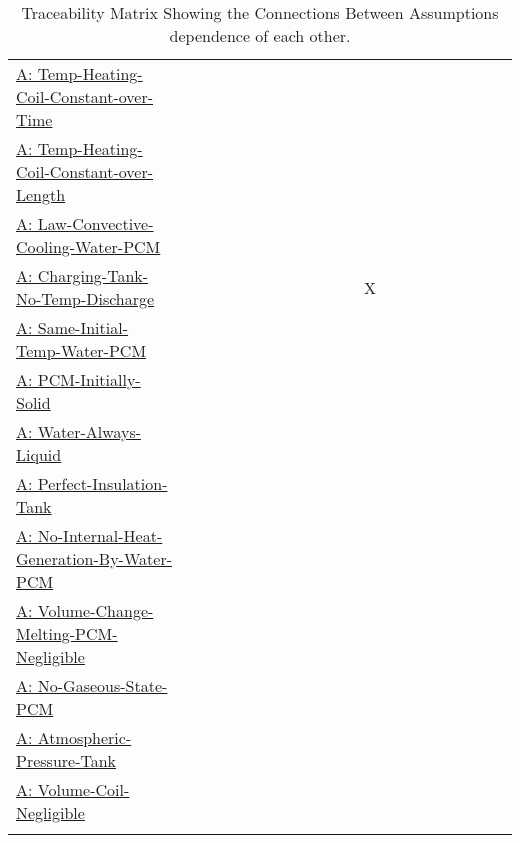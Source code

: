 \documentclass[12pt]{article}
\begin{document}
\begin{longtable}{l l l l l l l l l l l l l l l l l l l l l}
\\
\hyperref[assumpTHCCoT]{A: Temp-Heating-Coil-Constant-over-Time} &  &  &  &  &  &  &  &  &  &  &  &  &  &  &  &  &  &  &  & 
\\
\hyperref[assumpTHCCoL]{A: Temp-Heating-Coil-Constant-over-Length} &  &  &  &  &  &  &  &  &  &  &  &  &  &  &  &  &  &  &  & 
\\
\hyperref[assumpLCCWP]{A: Law-Convective-Cooling-Water-PCM} &  &  &  &  &  &  &  &  &  &  &  &  &  &  &  &  &  &  &  & 
\\
\hyperref[assumpCTNOD]{A: Charging-Tank-No-Temp-Discharge} &  &  &  &  &  &  &  &  &  &  &  & X &  &  &  &  &  &  &  & 
\\
\hyperref[assumpSITWP]{A: Same-Initial-Temp-Water-PCM} &  &  &  &  &  &  &  &  &  &  &  &  &  &  &  &  &  &  &  & 
\\
\hyperref[assumpPIS]{A: PCM-Initially-Solid} &  &  &  &  &  &  &  &  &  &  &  &  &  &  &  &  &  &  &  & 
\\
\hyperref[assumpWAL]{A: Water-Always-Liquid} &  &  &  &  &  &  &  &  &  &  &  &  &  &  &  &  &  &  &  & 
\\
\hyperref[assumpPIT]{A: Perfect-Insulation-Tank} &  &  &  &  &  &  &  &  &  &  &  &  &  &  &  &  &  &  &  & 
\\
\hyperref[assumpNIHGBWP]{A: No-Internal-Heat-Generation-By-Water-PCM} &  &  &  &  &  &  &  &  &  &  &  &  &  &  &  &  &  &  &  & 
\\
\hyperref[assumpVCMPN]{A: Volume-Change-Melting-PCM-Negligible} &  &  &  &  &  &  &  &  &  &  &  &  &  &  &  &  &  &  &  & 
\\
\hyperref[assumpNGSP]{A: No-Gaseous-State-PCM} &  &  &  &  &  &  &  &  &  &  &  &  &  &  &  &  &  &  &  & 
\\
\hyperref[assumpAPT]{A: Atmospheric-Pressure-Tank} &  &  &  &  &  &  &  &  &  &  &  &  &  &  &  &  &  &  &  & 
\\
\hyperref[assumpVCN]{A: Volume-Coil-Negligible} &  &  &  &  &  &  &  &  &  &  &  &  &  &  &  &  &  &  &  & 
\\
\bottomrule
\caption{Traceability Matrix Showing the Connections Between Assumptions dependence of each other.}
\label{Table:TraceMatAvsA}
\end{longtable}
\end{document}

